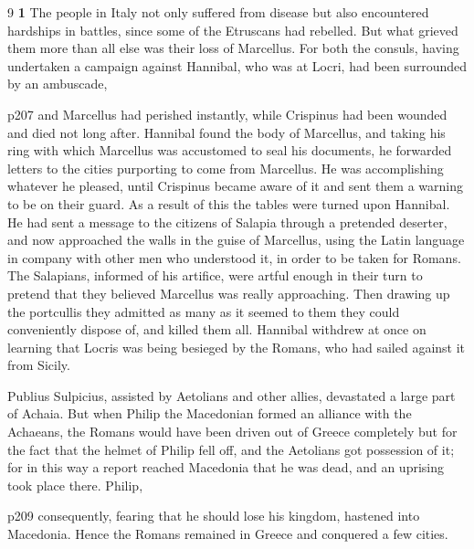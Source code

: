 9 \textbf{1} The people in Italy not only suffered from disease but also encountered hardships in battles, since some of the Etruscans had rebelled. But what grieved them more than all else was their loss of Marcellus. For both the consuls, having undertaken a campaign against Hannibal, who was at Locri, had been surrounded by an ambuscade,

p207 and Marcellus had perished instantly, while Crispinus had been wounded and died not long after. Hannibal found the body of Marcellus, and taking his ring with which Marcellus was accustomed to seal his documents, he forwarded letters to the cities purporting to come from Marcellus. He was accomplishing whatever he pleased, until Crispinus became aware of it and sent them a warning to be on their guard. As a result of this the tables were turned upon Hannibal. He had sent a message to the citizens of Salapia through a pretended deserter, and now approached the walls in the guise of Marcellus, using the Latin language in company with other men who understood it, in order to be taken for Romans. The Salapians, informed of his artifice, were artful enough in their turn to pretend that they believed Marcellus was really approaching. Then drawing up the portcullis they admitted as many as it seemed to them they could conveniently dispose of, and killed them all. Hannibal withdrew at once on learning that Locris was being besieged by the Romans, who had sailed against it from Sicily.

Publius Sulpicius, assisted by Aetolians and other allies, devastated a large part of Achaia. But when Philip the Macedonian formed an alliance with the Achaeans, the Romans would have been driven out of Greece completely but for the fact that the helmet of Philip fell off, and the Aetolians got possession of it; for in this way a report reached Macedonia that he was dead, and an uprising took place there. Philip,

p209 consequently, fearing that he should lose his kingdom, hastened into Macedonia. Hence the Romans remained in Greece and conquered a few cities.

